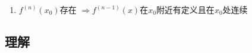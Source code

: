 \documentclass[a4paper,12pt]{article}
\begin{document}
\begin{enumerate}
\begin{itemize}
\begin{enumerate}[label=(\alph*)]
                \item 若 $f(x_0) = 0$，则：
                \[
                    \begin{cases}
                        f'(x_0) = 0
                        \;\Rightarrow\;
                        |f(x)| \text{ 在 } x_0 \text{ 处可导，且 }
                        \left.(|f(x)|)'\right\Big|_{x=x_0} = 0, \\[0.5em]
                        f'(x_0) \neq 0
                        \;\Rightarrow\;
                        |f(x)| \text{ 在 } x_0 \text{ 处{\color{red}{不可导}}}.
                    \end{cases}
                \]
                \item 总结不可导即:
                \[
                    \left.
                    \begin{aligned}
                        & f(x) \text{ 在 } x_0 \text{ 处可导} \\
                        & f(x_0) = 0 \\
                        & f'(x_0) \neq 0
                    \end{aligned}
                    \right\}
                    \;\Longrightarrow\;
                    |f(x)| \text{ 在 } x_0 \text{ 处 {\color{red}{不可导}}}
                \]
            \end{enumerate}
        \end{itemize}
        \item $f^{(n)}(x_0)$存在 $\Rightarrow f^{(n - 1)}(x)$在$x_0$附近有定义且在$x_0$处连续
    \end{enumerate}

    \subsection{理解}
\end{document}
